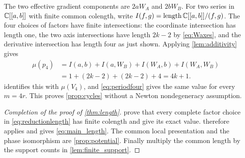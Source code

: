 The two effective gradient components are $2aW_A$ and $2bW_B$.
For two series in $\mathbb C[[a,b]]$ with finite common colength, write
$I(f,g)=\operatorname{length}\mathbb C[[a,b]]/(f,g)$. The four choices of factors have
finite intersections: the coordinate intersection has length one, the
two axis intersections have length $2k-2$ by \eqref{eq:Waxes}, and the
derivative intersection has length four as just shown. Applying
\cref{lem:additivity} gives
\begin{equation}\label{eq:cyclelength}
 \begin{aligned}
 \mu(p_4)
 &=I(a,b)+I(a,W_B)+I(W_A,b)+I(W_A,W_B)\\
 &=1+(2k-2)+(2k-2)+4=4k+1.
 \end{aligned}
\end{equation}
 identifies this with $\mu(V_4)$, and
\eqref{eq:periodfour} gives the same value for every $m=4r$.
This proves \cref{prop:cycles} without a Newton nondegeneracy assumption.

\begin{proof}[Completion of the proof of \cref{thm:length}]
 prove that every complete factor choice in
\eqref{eq:reductionlength} has finite colength and give its exact value.
 therefore applies and gives
\eqref{eq:main_length}. The common local presentation and the phase
isomorphism are \cref{prop:potential}. Finally multiply the common
length by the support counts in \cref{lem:finite_support}.
\end{proof}
